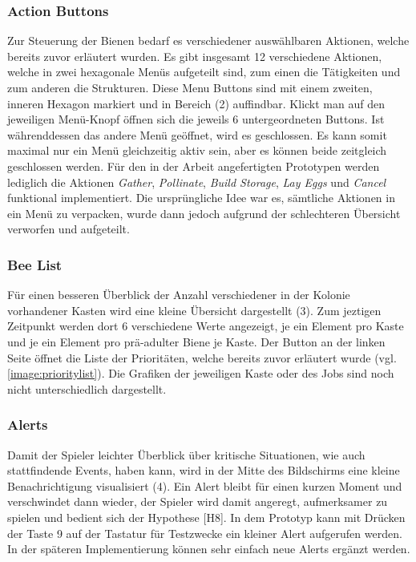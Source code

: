 \subsubsection{Action Buttons}
Zur Steuerung der Bienen bedarf es verschiedener auswählbaren Aktionen, welche bereits zuvor erläutert wurden. Es gibt insgesamt 12 verschiedene Aktionen, welche in zwei hexagonale Menüs aufgeteilt sind, zum einen die Tätigkeiten und zum anderen die Strukturen. Diese Menu Buttons sind mit einem zweiten, inneren Hexagon markiert und in Bereich (2) auffindbar. Klickt man auf den jeweiligen Menü-Knopf öffnen sich die jeweils 6 untergeordneten Buttons. Ist währenddessen das andere Menü geöffnet, wird es geschlossen. Es kann somit maximal nur ein Menü gleichzeitig aktiv sein, aber es können beide zeitgleich geschlossen werden. Für den in der Arbeit angefertigten Prototypen werden lediglich die Aktionen \textit{Gather}, \textit{Pollinate}, \textit{Build Storage}, \textit{Lay Eggs} und \textit{Cancel} funktional implementiert. Die ursprüngliche Idee war es, sämtliche Aktionen in ein Menü zu verpacken, wurde dann jedoch aufgrund der schlechteren Übersicht verworfen und aufgeteilt.

\subsubsection{Bee List}
Für einen besseren Überblick der Anzahl verschiedener in der Kolonie vorhandener Kasten wird eine kleine Übersicht dargestellt (3). Zum jeztigen Zeitpunkt werden dort 6 verschiedene Werte angezeigt, je ein Element pro Kaste und je ein Element pro prä-adulter Biene je Kaste. Der Button an der linken Seite öffnet die Liste der Prioritäten, welche bereits zuvor erläutert wurde (vgl. \autoref{image:prioritylist}). Die Grafiken der jeweiligen Kaste oder des Jobs sind noch nicht unterschiedlich dargestellt. 

\subsubsection{Alerts}
Damit der Spieler leichter Überblick über kritische Situationen, wie auch stattfindende Events, haben kann, wird in der Mitte des Bildschirms eine kleine Benachrichtigung visualisiert (4). Ein Alert bleibt für einen kurzen Moment und verschwindet dann wieder, der Spieler wird damit angeregt, aufmerksamer zu spielen und bedient sich der Hypothese [H8]. In dem Prototyp kann mit Drücken der Taste 9 auf der Tastatur für Testzwecke ein kleiner Alert aufgerufen werden. In der späteren Implementierung können sehr einfach neue Alerts ergänzt werden.

